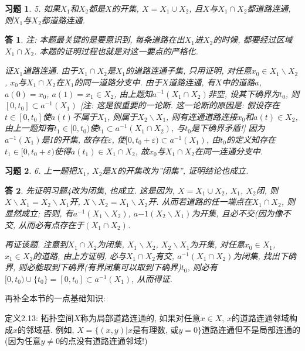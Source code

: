 \documentclass{ctexart}%
\newtheorem*{exercise}{习题}
\newtheorem*{solution}{答}
\theoremstyle{definition}
\theoremstyle{remark}
\begin{document}
\begin{exercise}5. 如果$X_1$和$X_2$都是$X$的开集, $X=X_1\cup X_2$, 且$X$与$X_1\cap X_2$都道路连通, 则$X_1$与$X_2$都道路连通.
\end{exercise}
\begin{solution}
注: 本题最关键的是要意识到, 每条道路在出$X_1$进$X_2$的时候, 都要经过区域$X_1\cap X_2$. 本题的证明过程也就是对这一要点的严格化. 

证$X_1$道路连通. 由于$X_1\cap X_2$是$X_1$的道路连通子集, 只用证明, 对任意$x_0\in X_1\backslash X_2$, $x_0$与$X_1\cap X_2$在$X_1$的同一道路分支中. 由于$X$道路连通, 有$X$中的道路$a$, $a(0)=x_0$, $a(1)=x_1\in X_2$, 由上题知$a^{-1}(X_1\cap X_2)$非空, 设其下确界为$t_0$, 则$[0,t_0]\subset a^{-1}(X_1)$ [注: 这是很重要的一论断. 这一论断的原因是: 假设存在$t\in [0,t_0]$使$a(t)$不属于$X_1$, 则属于$X_2\backslash X_1$, 则有连通道路连接$x_0$和$a(t)\in X_2$, 由上一题知有$t_1\in [0,t_0)$使$t_1\subset a^{-1}(X_1\cap X_2)$, 与$t_0$是下确界矛盾!] 因为$a^{-1}(X_1)$是$I$的开集, 故存在$\varepsilon$, 使$[0,t_0+\varepsilon)\subset a^{-1}(X_1)$, 由$t_0$的定义知存在$t_1\in[0,t_0+\varepsilon)$使得$a(t_1)\in
X_1\cap X_2$, 故$x_0$与$X_1\cap X_2$在同一连通分支中.
\end{solution}

\begin{exercise}6. 上一题把$X_1$, $X_2$是$X$的开集改为''闭集'', 证明结论也成立.
\end{exercise}
\begin{solution}
先证明习题4改为闭集, 也成立. 这是因为, $X=X_1\cup X_2$, $X_1$, $X_2$闭, 则$X\backslash X_1=X_2\backslash X_1$开, $X\backslash X_2=X_1\backslash X_2$开. 从而若道路的任一端点在$X_1\cap X_2$, 则显然成立; 否则, 有$a^{-1}(X_1\backslash X_2)$, $a{-1}(X_2\backslash X_1)$为开集, 且必不交(因为像不交, 从而必有点存在于$(X_1\cap X_2)$. 

再证该题. 注意到$X_1\cap X_2$为闭集, $X_1\backslash X_2$, $X_2\backslash X_1$为开集, 对任意$x_0\in X_1$, $x_1\in X_2$的道路, 由上方证明, 必与$X_1\cap X_2$有交, $a^{-1}(X_1\cap X_2)$为闭集, 找出下确界, 则必能取到下确界(有界闭集可以取到下确界)$t_0$, 则必有$[0,t_0)\cup\{t_0\}=[0,t_0]\subset a^{-1}(X_1)$, 从而得证. 
\end{solution}

再补全本节的一点基础知识: 

定义2.13: 拓扑空间$X$称为局部道路连通的, 如果对任意$x\in X$, $x$的道路连通邻域构成$x$的邻域基. 例如, $X=\{(x,y)|x\text{是有理数, 或}y=0\}$道路连通但不是局部连通的(因为任意$y\neq 0$的点没有道路连通邻域!)
\end{document}
